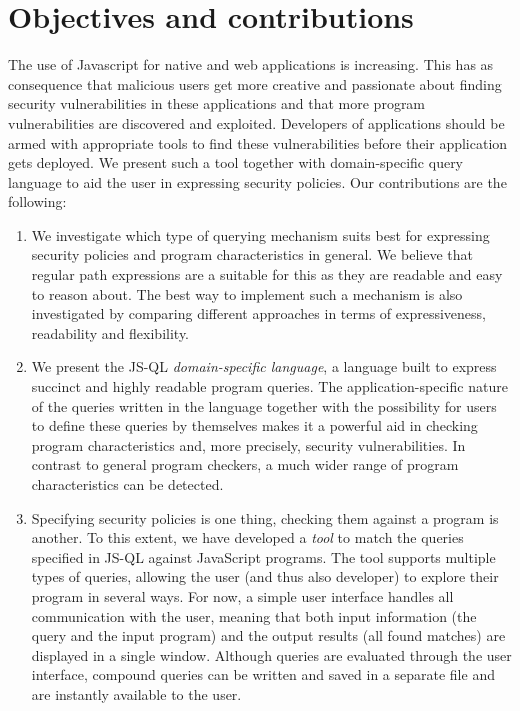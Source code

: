 \section{Objectives and contributions}
The use of Javascript for native and web applications is increasing. This has as consequence that malicious users get more creative and passionate about finding security vulnerabilities in these applications and that more program vulnerabilities are discovered and exploited. Developers of applications should be armed with appropriate tools to find these vulnerabilities before their application gets deployed. We present such a tool together with domain-specific query language to aid the user in expressing security policies. Our contributions are the following:
\begin{enumerate}
\item We investigate which type of querying mechanism suits best for expressing security policies and program characteristics in general. We believe that regular path expressions are a suitable for this as they are readable and easy to reason about. The best way to implement such a mechanism is also investigated by comparing different approaches in terms of expressiveness, readability and flexibility.
\item We present the JS-QL \textit{domain-specific language}, a language built to express succinct and highly readable program queries. The application-specific nature of the queries written in the language together with the possibility for users to define these queries by themselves makes it a powerful aid in checking program characteristics and, more precisely, security vulnerabilities. In contrast to general program checkers, a much wider range of program characteristics can be detected.
\item Specifying security policies is one thing, checking them against a program is another. To this extent, we have developed a \textit{tool} to match the queries specified in JS-QL against JavaScript programs. The tool supports multiple types of queries, allowing the user (and thus also developer) to explore their program in several ways. For now, a simple user interface handles all communication with the user, meaning that both input information (the query and the input program) and the output results (all found matches) are displayed in a single window. Although queries are evaluated through the user interface, compound queries can be written and saved in a separate file and are instantly available to the user.
\end{enumerate} 

